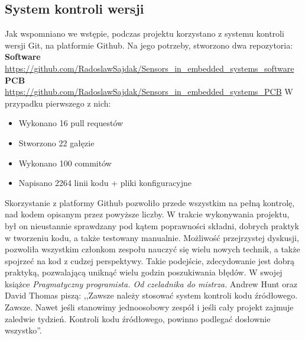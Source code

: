 \subsection{System kontroli wersji}
Jak wspomniano we wstępie, podczas projektu korzystano z systemu kontroli wersji Git, na platformie Github. Na jego potrzeby, stworzono dwa repozytoria:\newline
\textbf{Software}\newline
\url{https://github.com/RadoslawSajdak/Sensors_in_embedded_systems_software}\newline
\textbf{PCB}\newline
\url{https://github.com/RadoslawSajdak/Sensors_in_embedded_systems_PCB}\newline
\newline
W przypadku pierwszego z nich:
\begin{itemize}
    \item Wykonano 16 pull requestów
    \item Stworzono 22 gałęzie
    \item Wykonano 100 commitów
    \item Napisano 2264 linii kodu + pliki konfiguracyjne
\end{itemize}
Skorzystanie z platformy Github pozwoliło przede wszystkim na pełną kontrolę, nad kodem opisanym przez powyższe liczby. W trakcie wykonywania projektu, był on nieustannie sprawdzany pod kątem poprawności składni, dobrych praktyk w tworzeniu kodu, a także testowany manualnie. Możliwość przejrzystej dyskusji, pozwoliła wszystkim członkom zespołu nauczyć się wielu nowych technik, a także spojrzeć na kod z cudzej perspektywy. Takie podejście, zdecydowanie jest dobrą praktyką, pozwalającą uniknąć wielu godzin poszukiwania błędów. W swojej książce \textit{Pragmatyczny programista. Od czeladnika do mistrza.} Andrew Hunt oraz David Thomas piszą: ,,Zawsze należy stosować system kontroli kodu źródłowego. Zawsze. Nawet jeśli stanowimy jednoosobowy zespół i jeśli cały projekt zajmuje zaledwie tydzień. Kontroli kodu źródłowego, powinno podlegać dosłownie wszystko''\cite{pragmatic}.